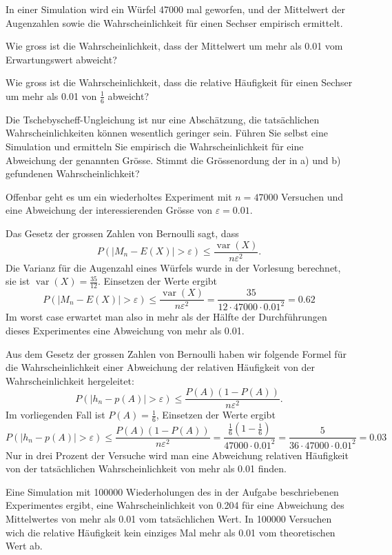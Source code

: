 In einer Simulation wird ein Würfel 47000 mal geworfen, und der Mittelwert
der Augenzahlen sowie die Wahrscheinlichkeit für einen Sechser empirisch
ermittelt.

\begin{teilaufgaben}
\item Wie gross ist die Wahrscheinlichkeit, dass der Mittelwert um mehr
als 0.01 vom Erwartungswert abweicht?
\item Wie gross ist die Wahrscheinlichkeit, dass die relative Häufigkeit
für einen Sechser um mehr als 0.01 von $\frac16$ abweicht?
\item Die Tschebyscheff-Ungleichung ist nur eine Abschätzung, die
tatsächlichen Wahrscheinlichkeiten können wesentlich geringer sein.
Führen Sie selbst eine Simulation und ermitteln Sie empirisch die
Wahrscheinlichkeit für eine Abweichung der genannten Grösse. 
Stimmt die Grössenordung der in a) und b) gefundenen Wahrscheinlichkeit?
\end{teilaufgaben}


\begin{loesung}
Offenbar geht es um ein wiederholtes Experiment mit $n=47000$ Versuchen
und eine Abweichung der interessierenden Grösse von $\varepsilon=0.01$.
\begin{teilaufgaben}
\item
Das Gesetz der grossen Zahlen von Bernoulli sagt, dass 
\[
P(|M_n-E(X)|>\varepsilon) \le
\frac{\operatorname{var}(X)}{n\varepsilon^2}.
\]
Die Varianz für die Augenzahl eines Würfels wurde in der Vorlesung berechnet,
sie ist
$\operatorname{var}(X)=\frac{35}{12}.$
Einsetzen der Werte ergibt
\[
P(|M_n-E(X)|>\varepsilon)\le
\frac{\operatorname{var}(X)}{n\varepsilon^2}
=\frac{35}{12\cdot 47000\cdot 0.01^2}=0.62
\]
Im worst case erwartet man also in mehr als der Hälfte der Durchführungen
dieses Experimentes eine Abweichung von mehr als  0.01.
\item
Aus dem Gesetz der grossen Zahlen von Bernoulli haben wir folgende Formel
für die Wahrscheinlichkeit einer Abweichung der relativen Häufigkeit von
der Wahrscheinlichkeit hergeleitet:
\[
P(|h_n-p(A)|>\varepsilon)\le \frac{P(A)(1-P(A))}{n\varepsilon^2}.
\]
Im vorliegenden Fall ist $P(A)=\frac16$, Einsetzen der Werte ergibt
\[
P(|h_n-p(A)|>\varepsilon)\le \frac{P(A)(1-P(A))}{n\varepsilon^2}
=\frac{\frac16(1-\frac16)}{47000\cdot 0.01^2}
=\frac{5}{36\cdot 47000\cdot 0.01^2}
=0.03
\]
Nur in drei Prozent der Versuche wird man eine Abweichung relativen
Häufigkeit von der tatsächlichen Wahrscheinlichkeit von mehr als 0.01
finden.
\item Eine Simulation mit 100000 Wiederholungen des in der Aufgabe
beschriebenen Experimentes ergibt, eine Wahrscheinlichkeit von 0.204
für eine Abweichung des Mittelwertes von mehr als 0.01 vom tatsächlichen
Wert. In 100000 Versuchen wich die relative Häufigkeit kein einziges
Mal mehr als 0.01 vom theoretischen Wert ab.
\qedhere
\end{teilaufgaben}
\end{loesung}


